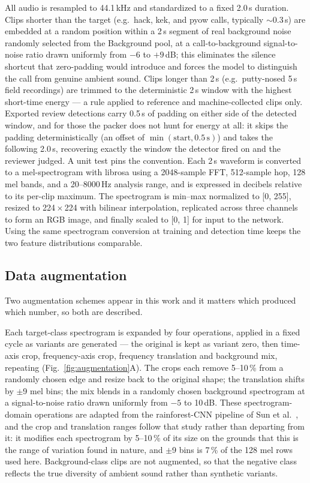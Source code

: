 \documentclass[review,3p,times]{elsarticle}
\begin{document}
All audio is resampled to 44.1\,kHz and standardized to a fixed 2.0\,s
duration. Clips shorter than the target (e.g.\ hack, kek, and pyow calls,
typically $\sim$0.3\,s) are embedded at a random position within a 2\,s
segment of real background noise randomly selected from the Background pool,
at a call-to-background signal-to-noise ratio drawn uniformly from $-6$ to
$+9$\,dB;
this eliminates the silence shortcut that zero-padding would introduce and
forces the model to distinguish the call from genuine ambient sound. Clips
longer than 2\,s (e.g.\ putty-nosed 5\,s field recordings) are trimmed to the
deterministic 2\,s window with the highest short-time energy --- a rule
applied to reference and machine-collected clips only. Exported review
detections carry 0.5\,s of padding on either side of the detected window, and
for those the packer does not hunt for energy at all: it skips the padding
deterministically (an offset of $\min(\mathrm{start}, 0.5\,\mathrm{s})$) and
takes the following 2.0\,s, recovering exactly the window the detector fired
on and the reviewer judged. A unit test pins the convention. Each 2\,s
waveform is converted to a mel-spectrogram with librosa \cite{mcfee2015} using
a 2048-sample FFT, 512-sample hop, 128 mel bands, and a 20--8000\,Hz analysis
range, and is expressed in decibels relative to its per-clip maximum. The
spectrogram is min--max normalized to [0, 255], resized to
224\,$\times$\,224 with bilinear interpolation, replicated across three
channels to form an RGB image, and finally scaled to [0, 1] for input to the
network. Using the same spectrogram conversion at training and detection time keeps the
two feature distributions comparable.

\subsection*{Data augmentation}

Two augmentation schemes appear in this work and it matters which produced
which number, so both are described.

Each target-class spectrogram is expanded by four operations, applied in a
fixed cycle as variants are generated --- the original is kept as variant
zero, then time-axis crop, frequency-axis crop, frequency translation and
background mix, repeating (Fig.~\ref{fig:augmentation}A). The crops each
remove 5--10\,\% from a randomly chosen edge and resize back to the original
shape; the translation shifts by $\pm$9 mel bins; the mix blends in a randomly
chosen background spectrogram at a signal-to-noise ratio drawn uniformly from
$-5$ to 10\,dB. These spectrogram-domain operations are adapted
from the rainforest-CNN pipeline of Sun et al.\ \cite{sun2022}, and the crop and
translation ranges follow that study rather than departing from it: it modifies
each spectrogram by 5--10\,\% of its size on the grounds that this is the range
of variation found in nature, and $\pm$9 bins is 7\,\% of the 128 mel rows used
here. Background-class clips are not augmented, so that the negative class
reflects the true diversity of ambient sound rather than synthetic variants.
\end{document}

